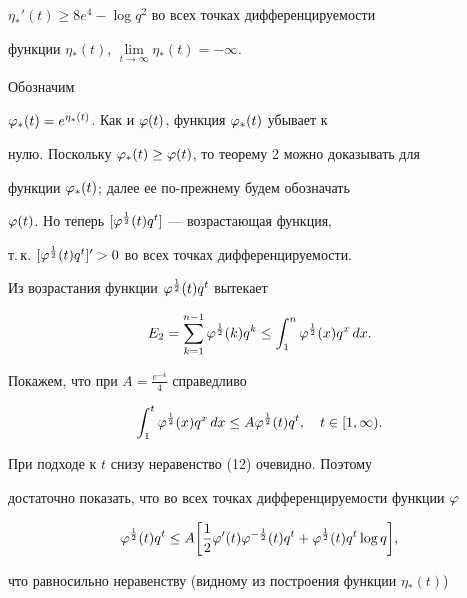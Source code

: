 $\eta_*'(t)\ge 8e^4-\log q^2$ во всех точках дифференцируемости


функции $\eta_*(t)$, $\lim\limits_{t\to\infty} \eta_*(t)=-\infty$.







Обозначим


$\varphi_*(t)=e^{\eta_*(t)}$. Как и $\varphi(t)$, функция $\varphi_*(t)$ убывает к


нулю. Поскольку $\varphi_*(t)\ge\varphi(t)$, то теорему 2 можно доказывать для


функции $\varphi_*(t)$; далее ее по-прежнему будем обозначать


$\varphi(t)$. Но теперь $[\varphi^{\frac 12}(t)q^t]$ --- возрастающая функция,


т.\,к. $[\varphi^{\frac 12}(t)q^t]'>0$ во всех точках дифференцируемости.





Из возрастания функции $\varphi^{\frac 12}(t)q^t$ вытекает 


\begin{equation}


E_2=\sum_{k=1}^{n-1}\p^{\frac 12}(k)q^k\leq


\int_1^n\p^{\frac 12} (x)q^x\, dx.


\end{equation}


Покажем, что при $A=\frac{e^{-4}}{4}$ справедливо 


\begin{equation}


\int_1^t\p^{\frac 12}(x)q^x\, dx\leq A\p^{\frac 12}(t)q^t,


\quad t\in[1,\infty).


\end{equation}


При подходе к $t$ снизу неравенство (12) очевидно. Поэтому


достаточно показать, что во всех точках дифференцируемости функции $\varphi$


$$


\p^{\frac 12}(t)q^t\leq A\bigg[\frac 12\p'(t)\p^{-\frac 12}(t)q^t+


\p^{\frac 12} (t)q^t\log q\bigg],


$$


что равносильно неравенству (видному из построения функции $\eta_*(t)$)


$$



